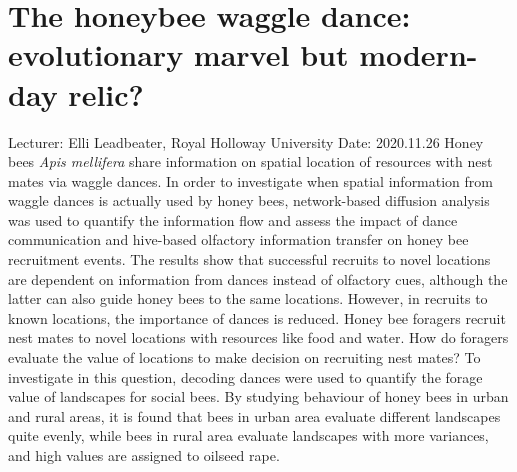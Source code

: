 \documentclass[11pt]{article}
\begin{document}
  \section{The honeybee waggle dance: evolutionary marvel but modern-day relic?}
  Lecturer: Elli Leadbeater, Royal Holloway University
  \newline
  Date: 2020.11.26
  \newline
  Honey bees \textit{Apis mellifera} share information on spatial location of resources with nest mates via waggle dances. 
  In order to investigate when spatial information from waggle dances is actually used by honey bees, network-based diffusion analysis was used to quantify the information flow and assess the impact of dance communication and hive-based olfactory information transfer on honey bee recruitment events. 
  The results show that successful recruits to novel locations are dependent on information from dances instead of olfactory cues, although the latter can also guide honey bees to the same locations. 
  However, in recruits to known locations, the importance of dances is reduced. 
  \newline
  Honey bee foragers recruit nest mates to novel locations with resources like food and water. 
  How do foragers evaluate the value of locations to make decision on recruiting nest mates? 
  To investigate in this question, decoding dances were used to quantify the forage value of landscapes for social bees. 
  By studying behaviour of honey bees in urban and rural areas, it is found that bees in urban area evaluate different landscapes quite evenly, while bees in rural area evaluate landscapes with more variances, and high values are assigned to oilseed rape.  

  \newpage
\end{document}
